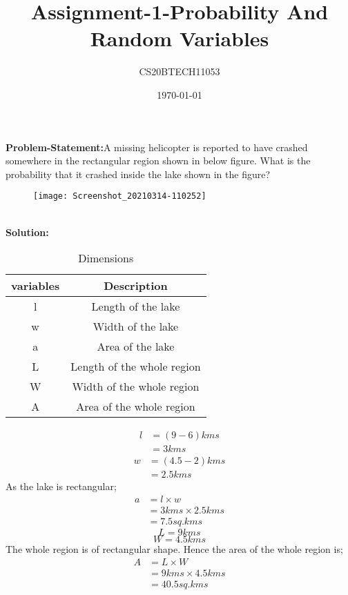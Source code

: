 \documentclass[11pt,a4paper,twocolumn]{article}
\title{Assignment-1-Probability And Random Variables}
\author{CS20BTECH11053 }
\date{\today}
\begin{document}
\maketitle

\textbf{Problem-Statement:}A missing helicopter is reported to have crashed somewhere in the rectangular region shown in below figure. What is the probability that it crashed inside the lake shown in the figure?
\begin{figure}[h]
\centering
 \texttt{[image: Screenshot\_20210314-110252]}
\end{figure}
\\\textbf{Solution:}
\begin{table}[h!]
    \label{Table-1}
    \caption{Dimensions}
    \centering
   
    \begin{tabular}{|c|c|}
    \hline
        variables & Description\\
        \hline
        l&Length of the lake\\
        \hline
        w&Width of the lake\\
        \hline
        a&Area of the lake\\
        \hline
        L&Length of the whole region\\
        \hline
        W&Width of the whole region\\
        \hline
        A&Area of the whole region\\
        \hline
        \end{tabular}
        \label{tab:my_label}
\end{table}
\begin{align}
l &= (9-6)kms\\
  &= 3kms 
\end{align}
\begin{align}
w&=(4.5-2)kms\\
 &=2.5kms
\end{align}
As the lake is rectangular;
\begin{align}
a &={l}\times{w}\\
&={3kms}\times{2.5kms}\\
&=7.5sq.kms
\end{align}
$$L=9kms$$
$$W=4.5kms$$
The whole region is of rectangular shape. Hence the area of the whole region is;
\begin{align}
A &={L}\times{W}\\
&={9kms}\times{4.5kms}\\
&=40.5sq.kms
\end{align}
\end{document}
